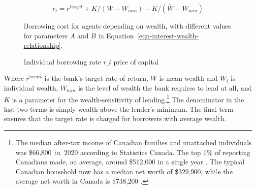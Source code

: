 {\begin{equation}
r_i = r^{target}+ K/(W-W_{min}) -K/(\bar W - W_{min})\label{eqn-interest-wealth-relationship}
\end{equation}

 

\begin{figure}[!hb]
\begin{center}
\caption[Borrowing cost for agents depending on wealth.]{Borrowing cost for agents depending on wealth, with different values for parameters $A$ and $B$ in Equation~\ref{eqn-interest-wealth-relationship}.} %
\label{fig-capital-cost}
\end{center}
\end{figure}

\begin{figure}
\centering
\label{fig-capital-cost}
\caption{Individual borrowing rate $r\_i$ price of capital}
\label{fig:Wealth-based}
\end{figure}

Where  $r^{target}$ is the bank's target rate of return,  $\bar{W}$ is mean wealth and $W_i$ is individual wealth, $W_{min}$ is the level of wealth the bank requires to lend at all, and $K$ is a parameter for the wealth-sensitivity of lending.\footnote{The median after-tax income of Canadian families and unattached individuals was \$66,800 in 2020 according to Statistics Canada.%
 The top 1\% of reporting Canadians made, on average, around \$512,000 in a single year \cite{WEB_model-stats-can-canadian-incomes}. %
 The typical Canadian household now has a median net worth of \$329,900, while the average net worth in Canada is \$738,200 \cite{WEB-model-stats-can-median-net-worth}.  %
} The denominator in the last two terms is simply wealth above the lender's minimum. The final term ensures that the target rate is charged for borrowers with average wealth.


}
